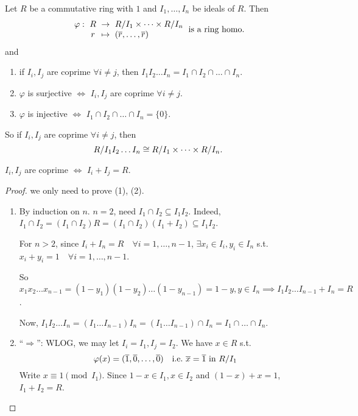 \begin{theorem}
  Let $R$ be a commutative ring with $1$ and $I_1, \dots, I_n$ be ideals of $R$.
  Then
  \[
    \arraycolsep=3pt
    \begin{array}{rccl}
      \varphi: & R & \to & \quot{R}{I_1} \times \dots \times \quot{R}{I_n} \\
               & r & \mapsto & (\ob{r}, \dots, \ob{r})
    \end{array}
    \text{~is a ring homo.}
  \]
  and
  \begin{enumerate}[(1)]
    \item if $I_i, I_j$ are coprime $\forall i \ne j$, then
      $I_1I_2\dots I_n = I_1 \cap I_2 \cap \dots \cap I_n$.
    \item $\varphi$ is surjective $\iff$ $I_i, I_j$ are coprime
      $\forall i \ne j$.
    \item $\varphi$ is injective $\iff$ $I_1 \cap I_2 \cap \dots \cap I_n
      = \{ 0 \}$.
  \end{enumerate}
  So if $I_i, I_j$ are coprime $\forall i \ne j$, then
  \[
    {R}/{I_1I_2\dots I_n} \cong
    {R}/{I_1} \times \dots \times {R}/{I_n}.
  \]

  $I_i, I_j$ are coprime $\iff$ $I_i + I_j = R$.

  \begin{proof}
    we only need to prove (1), (2).

    \begin{enumerate}[(1)]
      \item By induction on $n$. $n = 2$, need $I_1\cap I_2 \subseteq I_1I_2$.
        Indeed, $I_1\cap I_2 = (I_1\cap I_2)R = (I_1\cap I_2)(I_1+I_2)
        \subseteq I_1I_2$.

        For $n > 2$, since $I_i + I_n = R \quad \forall i = 1,\dots, n-1$,
        $\exists x_i \in I_i, y_i \in I_n$ s.t. $x_i + y_i = 1 \quad
        \forall i = 1,\dots, n-1$.

        So $x_1x_2\dots x_{n-1} = (1-y_1)(1-y_2)\dots(1-y_{n-1}) = 1 - y,
        y \in I_n
        \implies I_1I_2\dots I_{n-1} + I_n = R$.

        Now, $I_1I_2\dots I_n = (I_1\dots I_{n-1})I_n =
        (I_1\dots I_{n-1})\cap I_n = I_1\cap \dots \cap I_n$.
      \item ``$\Rightarrow$'': WLOG, we may let $I_i = I_1, I_j = I_2$.
        We have $x \in R$ s.t.
        \[
          \varphi(x) = (\overline{1}, \overline{0}, \dots, \overline{0})
          \quad \text{i.e.~}
          \overline{x} = \overline{1} \text{~in~} {R}/{I_1}
        \]
        Write $x \equiv 1 \pmod {I_1}$.
        Since $1 - x \in I_1, x \in I_2$ and $(1 - x) + x = 1$, $I_1 + I_2 = R$.


\end{enumerate}
\end{proof}
\end{theorem}
